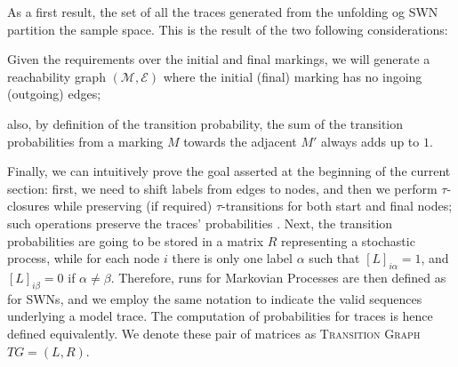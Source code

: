 As a first result, the set of all the traces generated from the unfolding og SWN partition the sample space. This is the result of the two following considerations: \begin{mylist} 
\item Given the requirements over the initial and final markings, we will generate a reachability graph $(\mathcal{M},\mathcal{E})$ where the initial (final) marking has no ingoing (outgoing) edges;
\item also, by definition of the transition probability, the sum of the transition probabilities from a marking $M$ towards the adjacent $M'$ always adds up to $1$.
\end{mylist}

Finally, we can intuitively prove the goal asserted at the beginning of the current section: first, we need to shift labels from edges to nodes, and then we perform $\tau$-closures while preserving (if required) $\tau$-transitions for both start and final nodes; such operations preserve the traces' probabilities \cite{Bergami21}. Next, the transition probabilities are going to be stored in a matrix $R$ representing a stochastic process, while for each node $i$ there is only one label $\alpha$ such that $[L]_{i\alpha}=1$, and $[L]_{i\beta}=0$ if $\alpha\neq\beta$. Therefore, runs for Markovian Processes are then defined as for SWNs, and we employ the same notation to indicate the valid sequences underlying a model trace. The computation of probabilities for traces is hence defined equivalently. We denote these pair of matrices as \textsc{Transition Graph} $TG=(L,R)$.

\endinput
Petri Nets and Generalized Stochastic Petri Nets are well-established formalisms \cite{DBLP:journals/tosem/PolyvyanyySWCM20} for modelling processes \cite{RoggeSoltiAW13} represented in the Petri Net Markup Language, supported by our tool. Due to the lack of space, we refer to \cite{spdwe} for the usual notation over Petri Nets. We restrict our interest to an interesting class of $1$-\textit{bounded} stochastic Petri nets with no timed transitions, namely \textsc{untimed Stochastic Workflow Nets} denoted as $N$. We now sketch the properties of the SWN sketched in \cite{Bergami21}. We consider a single \emph{input} (\emph{output}) marking $m_{in}$ ($m_{out}$) assigning a single token to the input (output) place, and no token elsewhere [\dots].


